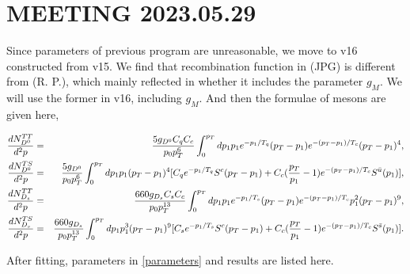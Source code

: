 \documentclass[twocolumn,aps,superscriptaddress,nofootinbib,floatfix]{revtex4}
\begin{document}
\section{MEETING 2023.05.29}
Since parameters of previous program are unreasonable, we move to v16 constructed from v15. We find that recombination function in \cite{Zhu_2020}(JPG) is different from \cite{Peng2010,Peng2011,Peng:2011zzd}(R. P.), which mainly reflected in whether it includes the parameter $g_M$. We will use the former in v16, including $g_M$. And then the formulae of mesons are given here,
\begin{widetext}
	\begin{eqnarray}
		\frac{dN^{TT}_{D^0}}{d^2p}&=&{5g_{D^0} C_q C_c\over p_0 p_T^6}\int_0^{p_T}dp_1 p_1 e^{-p_1/T_q} (p_T -p_1) e^{-(p_T -p_1)/T_c} (p_T -p_1)^4, \\
		\frac{dN^{TS}_{D^0}}{d^2p}&=&{5g_{D^0} \over p_0 p_T^6}\int_0^{p_T}dp_1 
		p_1(p_T -p_1)^4 [C_q e^{-p_1/T_q} S^c(p_T-p_1)+C_c({p_T\over p_1} -1) e^{-(p_T -p_1)/T_c}S^{\bar{u}}(p_1)] , \\
		\frac{dN^{TT}_{D_s}}{d^2p}&=&{660g_{D_s} C_s C_c\over p_0 p_T^{13}}\int_0^{p_T}dp_1 p_1 e^{-p_1/T_s} (p_T -p_1) e^{-(p_T -p_1)/T_c} p_1^2 (p_T -p_1)^9, \\
		\frac{dN^{TS}_{D_s}}{d^2p}&=&{660g_{D_s} \over p_0 p_T^{13}}\int_0^{p_T}dp_1 
		p_1^3(p_T -p_1)^9 [C_s e^{-p_1/T_s} S^c(p_T-p_1)+C_c({p_T\over p_1} -1) e^{-(p_T -p_1)/T_c}S^{\bar{s}}(p_1)] .
	\end{eqnarray}
\end{widetext}

After fitting, parameters in \ref{parameters} and results are listed here.

\begin{table}[htbp]
	\centering
	\caption{Parameters used in v16, in which $\gamma_0$ and $q_0$ are only for charm quark.}
	\label{parameters}
\end{table}
\end{document}

